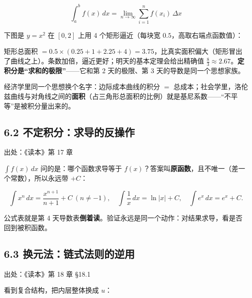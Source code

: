 \documentclass[UTF8,a4paper,11pt]{ctexart}
\newcommand{\src}[1]{%
  {\small\colorbox{refbg}{\color{refaccent}出处：#1}}}
\begin{document}
\[
  \int_a^b f(x)\,dx=\lim_{n\to\infty}\sum_{i=1}^{n}f(x_i)\,\Delta x
\]

下图是 $y=x^2$ 在 $[0,2]$ 上用 4 个矩形逼近（每块宽 $0.5$，高取右端点函数值）：

\begin{center}
\end{center}

矩形总面积 $=0.5\times(0.25+1+2.25+4)=3.75$，比真实面积偏大（矩形冒出了曲线之上）。条数加倍，逼近更好；明天的基本定理会给出精确值 $\tfrac{8}{3}\approx2.67$。\textbf{定积分是“求和的极限”}——它和第 2 天的极限、第 3 天的导数是同一个思想家族。

经济学里同一个思想换个名字：边际成本曲线的积分 $=$ 总成本；社会学里，洛伦兹曲线与对角线之间的\textbf{面积}（占三角形总面积的比例）就是基尼系数——“不平等”是被积分量出来的。

\subsection*{6.2 不定积分：求导的反操作}\src{《读本》第 17 章}

$\int f(x)\,dx$ 问的是：哪个函数求导等于 $f(x)$？答案叫\textbf{原函数}，且不唯一（差一个常数），所以永远带 $+C$：

\[
  \int x^{n}\,dx=\frac{x^{n+1}}{n+1}+C\ (n\neq-1),\quad
  \int\frac{1}{x}\,dx=\ln|x|+C,\quad
  \int e^{x}\,dx=e^{x}+C .
\]

公式表就是第 4 天导数表\textbf{倒着读}。验证永远是同一个动作：对结果求导，看是否回到被积函数。

\subsection*{6.3 换元法：链式法则的逆用}\src{《读本》第 18 章 §18.1}

看到复合结构，把内层整体换成 $u$：
\end{document}
